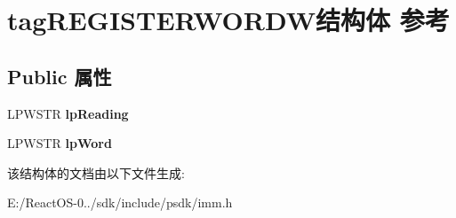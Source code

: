 \hypertarget{structtag_r_e_g_i_s_t_e_r_w_o_r_d_w}{}\section{tag\+R\+E\+G\+I\+S\+T\+E\+R\+W\+O\+R\+D\+W结构体 参考}
\label{structtag_r_e_g_i_s_t_e_r_w_o_r_d_w}
\subsection*{Public 属性}
\begin{DoxyCompactItemize}
\item 
\mbox{\label{structtag_r_e_g_i_s_t_e_r_w_o_r_d_w_a0be8df7c719fa2088c1dd06df4eb751c}} 
L\+P\+W\+S\+TR {\bfseries lp\+Reading}
\item 
\mbox{\label{structtag_r_e_g_i_s_t_e_r_w_o_r_d_w_a611f38f8f82f24c48393965a97d262e5}} 
L\+P\+W\+S\+TR {\bfseries lp\+Word}
\end{DoxyCompactItemize}


该结构体的文档由以下文件生成\+:\begin{DoxyCompactItemize}
\item 
E\+:/\+React\+O\+S-\/0../sdk/include/psdk/imm.\+h\end{DoxyCompactItemize}
